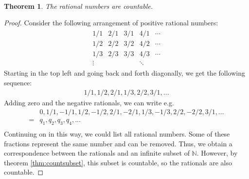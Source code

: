 \documentclass[12pt,reqno]{amsart}
\newtheorem{theorem}{Theorem}[section]
\theoremstyle{definition}
\begin{document}
\begin{theorem}
  The rational numbers are countable.
\end{theorem}
\begin{proof}
  Consider the following arrangement of positive rational numbers:
  \begin{align*}
    \begin{array}{ccccc} 
      1/1 & 2/1 & 3/1 & 4/1 & \cdots \\
      1/2 & 2/2 & 3/2 & 4/2 & \cdots \\
      1/3 & 2/3 & 3/3 & 4/3 & \cdots \\
      \vdots &  &  & \ddots 
    \end{array}
  \end{align*}
  Starting in the top left and going back and forth diagonally, we get
  the following sequence:
  \begin{align*}
    1/1, 1/2, 2/1, 1/3, 2/2, 3/1, ...
  \end{align*}
  Adding zero and the negative rationals, we can write e.g.\
  \begin{align*}
    & 0,1/1, -1/1, 1/2, -1/2, 2/1, -2/1, 1/3, -1/3, 2/2, -2/2, 3/1,
    ... \\
    = & q_1, q_2, q_3 , q_4, ... \\
  \end{align*}
  Continuing on in this way, we could list all rational numbers. Some
  of these fractions represent the same number and can be
  removed. Thus, we obtain a correspondence between the rationals and
  an infinite subset of $\mathbb{N}$. However, by theorem
  \ref{thm:countsubset}, this subset is countable, so the rationals
  are also countable.
\end{proof}
\end{document}

